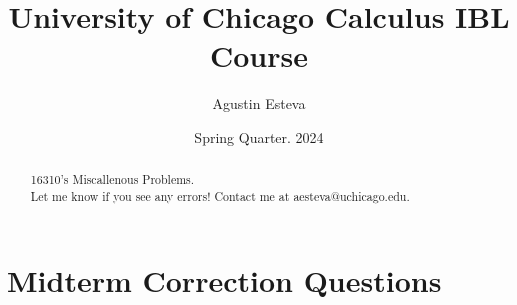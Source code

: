 \documentclass[openany, amssymb, psamsfonts]{amsart}
\title{University of Chicago Calculus IBL Course}
\author{Agustin Esteva}
\date{Spring Quarter. 2024}
\theoremstyle{definition}
\numberwithin{equation}{section}
\begin{document}
\begin{abstract}

16310's Miscallenous Problems.\\ Let me know if you see any errors! Contact me at aesteva@uchicago.edu.


\end{abstract}

\maketitle

\tableofcontents

\setcounter{section}{1}

\section*{Midterm Correction Questions}
\newpage
\end{document}
